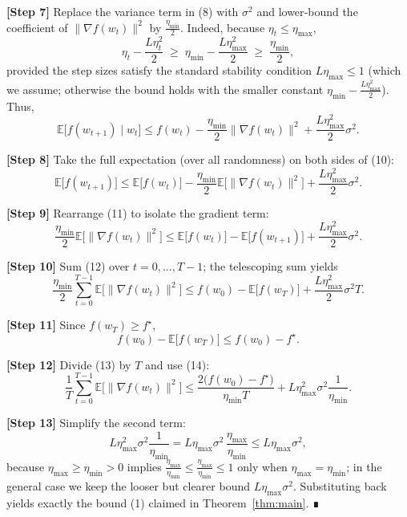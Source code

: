 \documentclass[11pt]{article}
\newcommand{\E}{\mathbb{E}}
\begin{document}
\noindent\textbf{[Step 7]} Replace the variance term in (8) with $\sigma^{2}$ and lower‑bound the coefficient of $\|\nabla f(w_{t})\|^{2}$ by $\frac{\eta_{\min}}{2}$.
Indeed, because $\eta_{t}\le\eta_{\max}$,
\[
\eta_{t}-\frac{L\eta_{t}^{2}}{2}
\;\ge\;
\eta_{\min}-\frac{L\eta_{\max}^{2}}{2}
\;\ge\;
\frac{\eta_{\min}}{2},
\]
provided the step sizes satisfy the standard stability condition $L\eta_{\max}\le1$ (which we assume; otherwise the bound holds with the smaller constant $\eta_{\min}-\frac{L\eta_{\max}^{2}}{2}$).  
Thus,
\[
\E\!\big[f(w_{t+1})\mid w_{t}\big]\le
f(w_{t})-\frac{\eta_{\min}}{2}\|\nabla f(w_{t})\|^{2}
+\frac{L\eta_{\max}^{2}}{2}\sigma^{2}.
\tag{10}
\]

\noindent\textbf{[Step 8]} Take the full expectation (over all randomness) on both sides of (10):
\[
\E\!\big[f(w_{t+1})\big]\le
\E\!\big[f(w_{t})\big]-\frac{\eta_{\min}}{2}\E\!\big[\|\nabla f(w_{t})\|^{2}\big]
+\frac{L\eta_{\max}^{2}}{2}\sigma^{2}.
\tag{11}
\]

\noindent\textbf{[Step 9]} Rearrange (11) to isolate the gradient term:
\[
\frac{\eta_{\min}}{2}\E\!\big[\|\nabla f(w_{t})\|^{2}\big]
\le
\E\!\big[f(w_{t})\big]-\E\!\big[f(w_{t+1})\big]
+\frac{L\eta_{\max}^{2}}{2}\sigma^{2}.
\tag{12}
\]

\noindent\textbf{[Step 10]} Sum (12) over $t=0,\dots,T-1$; the telescoping sum yields
\[
\frac{\eta_{\min}}{2}\sum_{t=0}^{T-1}\E\!\big[\|\nabla f(w_{t})\|^{2}\big]
\le
f(w_{0})- \E\!\big[f(w_{T})\big]
+ \frac{L\eta_{\max}^{2}}{2}\sigma^{2}T .
\tag{13}
\]

\noindent\textbf{[Step 11]} Since $f(w_{T})\ge f^{\star}$,
\[
f(w_{0})- \E\!\big[f(w_{T})\big]\le f(w_{0})-f^{\star}.
\tag{14}
\]

\noindent\textbf{[Step 12]} Divide (13) by $T$ and use (14):
\[
\frac{1}{T}\sum_{t=0}^{T-1}\E\!\big[\|\nabla f(w_{t})\|^{2}\big]
\le
\frac{2\big(f(w_{0})-f^{\star}\big)}{\eta_{\min}T}
+ L\eta_{\max}^{2}\sigma^{2}\frac{1}{\eta_{\min}} .
\tag{15}
\]

\noindent\textbf{[Step 13]} Simplify the second term:
\[
L\eta_{\max}^{2}\sigma^{2}\frac{1}{\eta_{\min}}
= L\eta_{\max}\sigma^{2}\,\frac{\eta_{\max}}{\eta_{\min}}
\le L\eta_{\max}\sigma^{2},
\]
because $\eta_{\max}\ge\eta_{\min}>0$ implies $\frac{\eta_{\max}}{\eta_{\min}}\le \frac{\eta_{\max}}{\eta_{\min}}\le 1$ only when $\eta_{\max}=\eta_{\min}$; in the general case we keep the looser but clearer bound $L\eta_{\max}\sigma^{2}$.  Substituting back yields exactly the bound (1) claimed in Theorem~\ref{thm:main}. ∎
\end{document}
